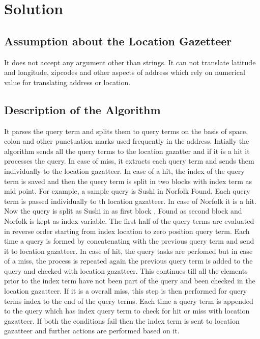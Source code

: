 \documentclass[12pt]{report}
\begin{document}
\section{Solution}
\subsection{Assumption about the Location Gazetteer}
It does not accept any argument other than strings. It can not translate latitude and longitude, zipcodes and other aspects of address which rely on numerical value for translating address or location. 
\subsection{Description of the Algorithm}
It parses the query term and splits them to query terms on the basis of space, colon and other punctuation marks used frequently in the address. Intially the algorithm sends all the query terms to the location gazatter and if it is a hit it processes the query. In case of miss, it extracts each query term and sends them individually to the location gazatteer. In case of a hit, the index of the query term is saved and then the query term is split in two blocks with index term as mid point. For example, a sample query is Sushi in Norfolk Found. Each query term is passed individually to th location gazatteer. In case of Norfolk it is a hit. Now the query is split as Sushi in as first block , Found as second block and Norfolk is kept as index variable. The first half of the query terms are evaluated in reverse order starting from index location to zero position query term. Each time a query is formed by concatenating with the previous query term and send it to location gazatteer. In case of hit, the query tasks are perfomed but in case of a miss, the process is repeated again the previous query term is added to the query and checked with location gazatteer. This continues till all the elements prior to the index term have not been part of the query and been checked in the location gazatteer. If it is a overall miss, this step is then performed for query terms index to the end of the query terms. Each time a query term is appended to the query which has index query term to check for hit or miss with location gazatteer. If both the conditions fail then the index term is sent to location gazatteer and further actions are performed based on it. 
 
\end{document}
